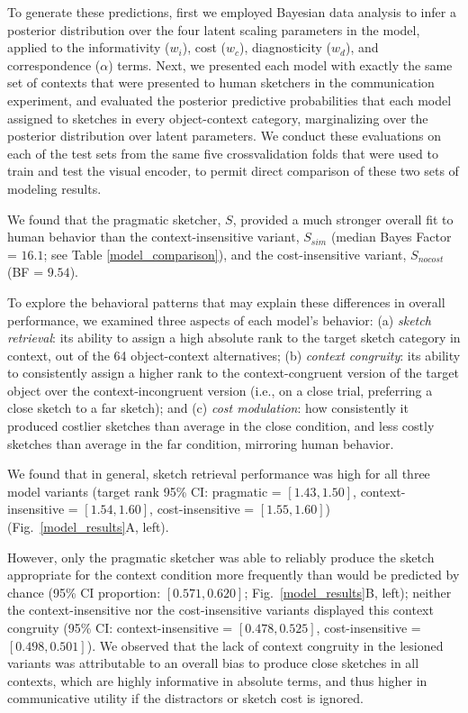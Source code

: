 \documentclass[9pt,twocolumn,twoside]{pnas-new}
\begin{document}
To generate these predictions, first we employed Bayesian data analysis to infer a posterior distribution over the four latent scaling parameters in the model, applied to the informativity ($w_{i}$), cost ($w_{c}$), diagnosticity ($w_{d}$), and correspondence ($\alpha$) terms. 
Next, we presented each model with exactly the same set of contexts that were presented to human sketchers in the communication experiment, and evaluated the posterior predictive probabilities that each model assigned to sketches in every object-context category, marginalizing over the posterior distribution over latent parameters. 
We conduct these evaluations on each of the test sets from the same five crossvalidation folds that were used to train and test the visual encoder, to permit direct comparison of these two sets of modeling results. 

We found that the pragmatic sketcher, $S$, provided a much stronger overall fit to human behavior than the context-insensitive variant, $S_{sim}$ (median Bayes Factor = $16.1$; see Table \ref{model_comparison}), and the cost-insensitive variant, $S_{nocost}$ (BF = $9.54$). 

To explore the behavioral patterns that may explain these differences in overall performance, we examined three aspects of each model's behavior: (a) \textit{sketch retrieval}: its ability to assign a high absolute rank to the target sketch category in context, out of the 64 object-context alternatives; (b) \textit{context congruity}: its ability to consistently assign a higher rank to the context-congruent version of the target object over the context-incongruent version (i.e., on a close trial, preferring a close sketch to a far sketch); and (c) \textit{cost modulation}: how consistently it produced costlier sketches than average in the close condition, and less costly sketches than average in the far condition, mirroring human behavior.

We found that in general, sketch retrieval performance was high for all three model variants (target rank 95\% CI: pragmatic = $[1.43, 1.50]$, context-insensitive = $[1.54, 1.60]$, cost-insensitive = $[1.55, 1.60]$) (Fig.~\ref{model_results}A, left).

However, only the pragmatic sketcher was able to reliably produce the sketch appropriate for the context condition more frequently than would be predicted by chance (95\% CI proportion: $[0.571, 0.620]$; Fig.~\ref{model_results}B, left); neither the context-insensitive nor the cost-insensitive variants displayed this context congruity (95\% CI: context-insensitive = $[0.478, 0.525]$, cost-insensitive = $[0.498, 0.501]$). 
We observed that the lack of context congruity in the lesioned variants was attributable to an overall bias to produce close sketches in all contexts, which are highly informative in absolute terms, and thus higher in communicative utility if the distractors or sketch cost is ignored. 
\end{document}
